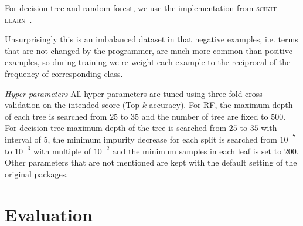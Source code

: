 \documentclass[conference]{IEEEtran}
\begin{document}
For decision tree and random forest, we use the implementation from
\textsc{scikit-learn}~\cite{scikit-learn}.

Unsurprisingly this is an imbalanced dataset in that negative examples, i.e.
terms that are not changed by the programmer, are much more common than
positive examples, so during training we re-weight each example to the reciprocal
of the frequency of corresponding class.

\emph{Hyper-parameters}
All hyper-parameters are tuned using three-fold cross-validation on the
intended score (Top-$k$ accuracy).
For RF, the maximum depth of each tree is searched from $25$ to $35$ and the
number of tree are fixed to $500$.
For decision tree maximum depth of the tree is searched from $25$ to $35$ with interval of $5$,
the minimum impurity decrease for each split is searched from $10^{-7}$ to
$10^{-3}$ with multiple of $10^{-2}$ and the minimum samples in each leaf is set to $200$.
Other parameters that are not mentioned are kept with the default setting of the
original packages.



\section{Evaluation}
\label{sec-eval}
\end{document}
